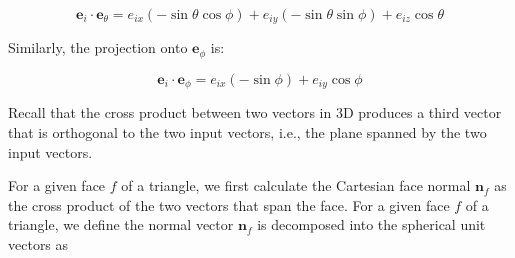 \[
\mathbf{e}_i \cdot \mathbf{e}_\theta = e_{ix} \left( -\sin \theta \cos \phi \right) + e_{iy} \left( -\sin \theta \sin \phi \right) + e_{iz} \cos \theta
\]

Similarly, the projection onto \( \mathbf{e}_\phi \) is:

\[
\mathbf{e}_i \cdot \mathbf{e}_\phi = e_{ix} \left( -\sin \phi \right) + e_{iy} \cos \phi
\]

Recall that the cross product between two vectors in 3D produces a third vector that is orthogonal to the two input vectors, i.e., the plane spanned by the two input vectors.

For a given face $f$ of a triangle, we first calculate the Cartesian face normal $\mathbf{n}_f$ as the cross product of the two vectors that span the face.
For a given face $f$ of a triangle, we define the normal vector $\mathbf{n}_f$ is decomposed into the spherical unit vectors as


